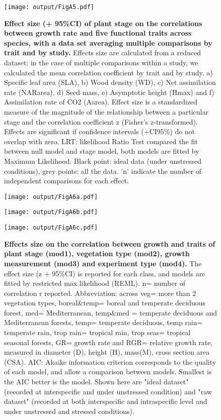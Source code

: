 \documentclass[a4paper]{article}\usepackage[]{graphicx}\usepackage[]{color}
\begin{document}
\begin{appendices}
\begin{figure}[h!]
\centering
\texttt{[image: output/FigA5.pdf]}
\caption{\textbf{Effect size (+ 95\%CI) of plant stage on the correlations between growth rate and five functional traits across species, with a data set averaging multiple comparisons by trait and by study.} Effects size are calculated from a reduced dataset; in the case of multiple comparisons within a study, we calculated the mean correlation coefficient by trait and by study. a) Specific leaf area (SLA), b) Wood density (WD), c) Net assimilation rate (NARarea), d) Seed mass, e) Asymptotic height (Hmax) and f) Assimilation rate of CO2 (Aarea). Effect size is a standardized measure of the magnitude of the relationship between a particular stage and the correlation coefficient z (Fisher's z-transformed). Effects are significant if confidence intervals (+CI95\%) do not overlap with zero. LRT: likelihood Ratio Test compared the fit between null model and stage model, both models are fitted by Maximum Likelihood. Black point: ideal data (under unstressed conditions), grey points: all the data. 'n' indicate the number of independent comparisons for each effect.}
\label{FigA5}
\end{figure}


\begin{figure}[h!]
\centering
\texttt{[image: output/FigA6a.pdf]}
\end{figure}

\begin{figure}[h!]
\centering
\texttt{[image: output/FigA6b.pdf]}
\end{figure}

\begin{figure}[h!]
\centering
\texttt{[image: output/FigA6c.pdf]}
\caption{\textbf{Effects size on the correlation between growth and traits of plant stage (mod1), vegetation type (mod2), growth measurement (mod3) and experiment type (mod4).} The effect size (z + 95\%CI) is reported for each class, and models are fitted by restricted max likelihood (REML). n= number of correlation r reported. Abbreviation: across veg= more than 2 vegetation types, boreal\&temp= boreal and temperate deciduous forest, med= Mediterranean,  temp\&med = temperate deciduous and Mediterranean forests, temp= temperate deciduous, temp rain= temperate rain, trop rain= tropical rain, trop seas= tropical seasonal forests, GR= growth rate and RGR= relative growth rate, measured in diameter (D), height (H), mass(M), cross section area (CSA). AIC: Akaike information criterion corresponds to the quality of each model, and allow a comparison between models. Smallest is the AIC better is the model. Shown here are "ideal dataset" (recorded at interspecific and under unstressed condition) and "raw dataset" (recorded at both interspecific and intraspecific level and under unstressed and stressed conditions).}
\label{FigA6}
\end{figure}


\end{appendices}
\end{document}
